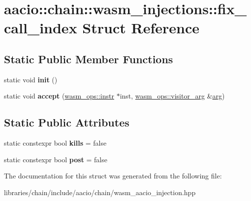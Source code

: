 \hypertarget{structaacio_1_1chain_1_1wasm__injections_1_1fix__call__index}{}\section{aacio\+:\+:chain\+:\+:wasm\+\_\+injections\+:\+:fix\+\_\+call\+\_\+index Struct Reference}
\label{structaacio_1_1chain_1_1wasm__injections_1_1fix__call__index}
\subsection*{Static Public Member Functions}
\begin{DoxyCompactItemize}
\item 
\mbox{\label{structaacio_1_1chain_1_1wasm__injections_1_1fix__call__index_a80574e4817c532978d3d87fa981fbaa1}} 
static void {\bfseries init} ()
\item 
\mbox{\label{structaacio_1_1chain_1_1wasm__injections_1_1fix__call__index_a02a91d23406b92e4839c9b9e9be4cd2c}} 
static void {\bfseries accept} (\mbox{\hyperlink{structaacio_1_1chain_1_1wasm__ops_1_1instr}{wasm\+\_\+ops\+::instr}} $\ast$inst, \mbox{\hyperlink{structaacio_1_1chain_1_1wasm__ops_1_1visitor__arg}{wasm\+\_\+ops\+::visitor\+\_\+arg}} \&\mbox{\hyperlink{unionarg}{arg}})
\end{DoxyCompactItemize}
\subsection*{Static Public Attributes}
\begin{DoxyCompactItemize}
\item 
\mbox{\label{structaacio_1_1chain_1_1wasm__injections_1_1fix__call__index_af485b2c36a17e3bf8dff366c025e08ff}} 
static constexpr bool {\bfseries kills} = false
\item 
\mbox{\label{structaacio_1_1chain_1_1wasm__injections_1_1fix__call__index_aa1fd947a1867c9d6dc512e4efd6ce992}} 
static constexpr bool {\bfseries post} = false
\end{DoxyCompactItemize}


The documentation for this struct was generated from the following file\+:\begin{DoxyCompactItemize}
\item 
libraries/chain/include/aacio/chain/wasm\+\_\+aacio\+\_\+injection.\+hpp\end{DoxyCompactItemize}
